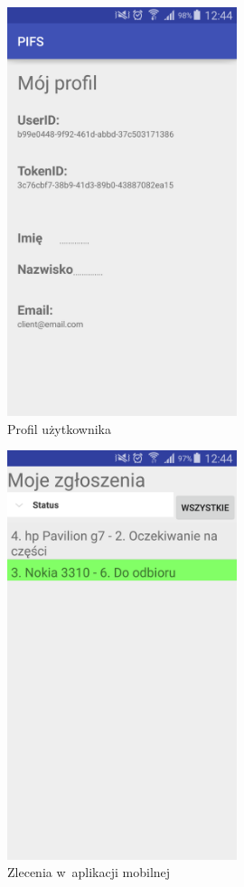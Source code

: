 \documentclass[a4paper,11pt]{article}
\begin{document}
\begin{figure}[h!]
	\centering
	\includegraphics[width=0.6\textwidth,height=0.9\textheight]{profilPolski.png}
	\caption{Profil użytkownika}
\end{figure}


\begin{figure}[h!]
	\centering
	\includegraphics[width=0.6\textwidth,height=0.9\textheight]{zleceniaMobile.png}
	\caption{Zlecenia w~aplikacji mobilnej}
\end{figure}
\end{document}
